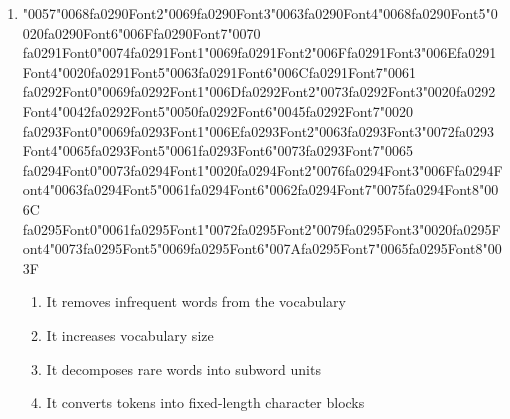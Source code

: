 \documentclass[12pt]{article}
\begin{document}
\begin{enumerate}[label=Q\arabic*.]
 \begin{enumerate}[label=(\Alph*)]
     \item Biased gradient estimates but lower variance
     \item Deterministic updates with faster convergence
     \item Unbiased gradient estimates with higher variance
     \item Smaller parameter magnitudes
 \end{enumerate}
 
 \item {\char"0057}{\char"0068}{\csname fa0290Font2\endcsname\char"0069}{\csname fa0290Font3\endcsname\char"0063}{\csname fa0290Font4\endcsname\char"0068}{\csname fa0290Font5\endcsname\char"0020}{\csname fa0290Font6\endcsname\char"006F}{\csname fa0290Font7\endcsname\char"0070} {\csname fa0291Font0\endcsname\char"0074}{\csname fa0291Font1\endcsname\char"0069}{\csname fa0291Font2\endcsname\char"006F}{\csname fa0291Font3\endcsname\char"006E}{\csname fa0291Font4\endcsname\char"0020}{\csname fa0291Font5\endcsname\char"0063}{\csname fa0291Font6\endcsname\char"006C}{\csname fa0291Font7\endcsname\char"0061} {\csname fa0292Font0\endcsname\char"0069}{\csname fa0292Font1\endcsname\char"006D}{\csname fa0292Font2\endcsname\char"0073}{\csname fa0292Font3\endcsname\char"0020}{\csname fa0292Font4\endcsname\char"0042}{\csname fa0292Font5\endcsname\char"0050}{\csname fa0292Font6\endcsname\char"0045}{\csname fa0292Font7\endcsname\char"0020} {\csname fa0293Font0\endcsname\char"0069}{\csname fa0293Font1\endcsname\char"006E}{\csname fa0293Font2\endcsname\char"0063}{\csname fa0293Font3\endcsname\char"0072}{\csname fa0293Font4\endcsname\char"0065}{\csname fa0293Font5\endcsname\char"0061}{\csname fa0293Font6\endcsname\char"0073}{\csname fa0293Font7\endcsname\char"0065} {\csname fa0294Font0\endcsname\char"0073}{\csname fa0294Font1\endcsname\char"0020}{\csname fa0294Font2\endcsname\char"0076}{\csname fa0294Font3\endcsname\char"006F}{\csname fa0294Font4\endcsname\char"0063}{\csname fa0294Font5\endcsname\char"0061}{\csname fa0294Font6\endcsname\char"0062}{\csname fa0294Font7\endcsname\char"0075}{\csname fa0294Font8\endcsname\char"006C} {\csname fa0295Font0\endcsname\char"0061}{\csname fa0295Font1\endcsname\char"0072}{\csname fa0295Font2\endcsname\char"0079}{\csname fa0295Font3\endcsname\char"0020}{\csname fa0295Font4\endcsname\char"0073}{\csname fa0295Font5\endcsname\char"0069}{\csname fa0295Font6\endcsname\char"007A}{\csname fa0295Font7\endcsname\char"0065}{\csname fa0295Font8\endcsname\char"003F}
 \begin{enumerate}[label=(\Alph*)]
     \item It removes infrequent words from the vocabulary
     \item It increases vocabulary size
     \item It decomposes rare words into subword units
     \item It converts tokens into fixed-length character blocks
 \end{enumerate}
 

\end{enumerate}
\end{document}
